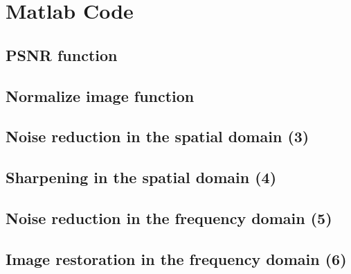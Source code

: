 \appendix
\newpage

\section{Matlab Code}
\subsection{PSNR function}


\subsection{Normalize image function}


\subsection{Noise reduction in the spatial domain (3)}


\subsection{Sharpening in the spatial domain (4)}


\subsection{Noise reduction in the frequency domain (5)}


\subsection{Image restoration in the frequency domain (6)}

